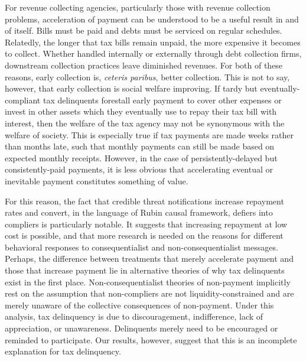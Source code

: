 \documentclass[12pt,titlepage]{article}
\begin{document}
For revenue collecting agencies, particularly those with revenue collection 
problems, acceleration of payment can be understood to be a useful result 
in and of itself. Bills must be paid and debts must be serviced on regular 
schedules. Relatedly, the longer that tax bills remain unpaid, the more 
expensive it becomes to collect. Whether handled internally or externally 
through debt collection firms, downstream collection practices leave 
diminished revenues. For both of these reasons, early collection is, 
\textit{ceteris paribus}, better collection. This is not to say, 
however, that early collection is social welfare improving. If tardy 
but eventually-compliant tax delinquents forestall early payment to 
cover other expenses or invest in other assets which they eventually 
use to repay their tax bill with interest, then the welfare of the tax 
agency may not be synonymous with the welfare of society. This is 
especially true if tax payments are made weeks rather than months late, 
such that monthly payments can still be made based on expected monthly 
receipts. However, in the case of persistently-delayed but consistently-paid 
payments, it is less obvious that accelerating eventual or inevitable 
payment constitutes something of value. 

For this reason, the fact that credible threat notifications increase 
repayment rates and convert, in the language of Rubin causal framework, 
defiers into compliers is particularly notable. It suggests that 
increasing repayment at low cost is possible, and that more research is 
needed on the reasons for different behavioral responses to 
consequentialist and non-consequentialist messages. Perhaps, the difference 
between treatments that merely accelerate payment and those that increase 
payment lie in alternative theories of why tax delinquents exist in the 
first place. Non-consequentialist theories of non-payment implicitly rest 
on the assumption that non-compliers are not liquidity-constrained and are
merely unaware of the collective consequences of non-payment. Under this 
analysis, tax delinquency is due to discouragement, indifference, 
lack of appreciation, or unawareness. Delinquents merely need to be 
encouraged or reminded to participate. Our results, however, suggest 
that this is an incomplete explanation for tax delinquency. 
\end{document}
